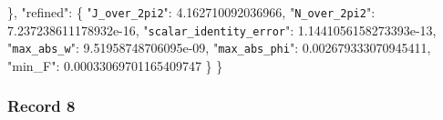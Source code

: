 \documentclass[
  10pt,
]{article}
\newenvironment{Shaded}{}{}
\newcommand{\DataTypeTok}[1]{\textcolor[rgb]{0.56,0.13,0.00}{#1}}
\newcommand{\FloatTok}[1]{\textcolor[rgb]{0.25,0.63,0.44}{#1}}
\newcommand{\FunctionTok}[1]{\textcolor[rgb]{0.02,0.16,0.49}{#1}}
\begin{document}
\begin{Shaded}
\begin{Highlighting}[]
  \FunctionTok{\},}
  \DataTypeTok{"refined"}\FunctionTok{:} \FunctionTok{\{}
    \DataTypeTok{"\nolinkurl{J_over_2pi2}"}\FunctionTok{:} \FloatTok{4.162710092036966}\FunctionTok{,}
    \DataTypeTok{"\nolinkurl{N_over_2pi2}"}\FunctionTok{:} \FloatTok{7.237238611178932e{-}16}\FunctionTok{,}
    \DataTypeTok{"\nolinkurl{scalar_identity_error}"}\FunctionTok{:} \FloatTok{1.1441056158273393e{-}13}\FunctionTok{,}
    \DataTypeTok{"\nolinkurl{max_abs_w}"}\FunctionTok{:} \FloatTok{9.51958748706095e{-}09}\FunctionTok{,}
    \DataTypeTok{"\nolinkurl{max_abs_phi}"}\FunctionTok{:} \FloatTok{0.002679333070945411}\FunctionTok{,}
    \DataTypeTok{"min\_F"}\FunctionTok{:} \FloatTok{0.00033069701165409747}
  \FunctionTok{\}}
\FunctionTok{\}}
\end{Highlighting}
\end{Shaded}

\hypertarget{record-8}{%
\subsubsection{Record 8}\label{record-8}}
\end{document}
